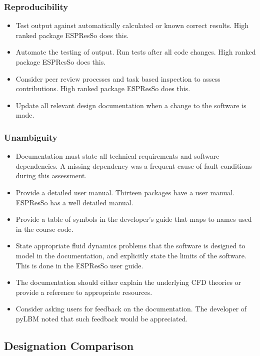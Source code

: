 \documentclass[12pt, notitlepage]{article}
\begin{document}
\subsubsection{Reproducibility}

\begin{itemize}
	\item Test output against automatically calculated or known correct results. High ranked package ESPResSo does this.
	\item Automate the testing of output. Run tests after all code changes. High ranked package ESPResSo does this.
	\item Consider peer review processes and task based inspection to assess contributions. High ranked package ESPResSo does this.
	\item Update all relevant design documentation when a change to the software is made.
\end{itemize}

\subsubsection{Unambiguity}

\begin{itemize}
	\item Documentation must state all technical requirements and software dependencies. A missing dependency was a frequent cause of fault conditions during this assessment.
	\item Provide a detailed user manual. Thirteen packages have a user manual. ESPResSo has a well detailed manual.
	\item Provide a table of symbols in the developer's guide that maps to names used in the course code.
	\item State appropriate fluid dynamics problems that the software is designed to model in the documentation, and explicitly state the limits of the software. This is done in the ESPResSo user guide.
	\item The documentation should either explain the underlying CFD theories or provide a reference to appropriate resources.
	\item Consider asking users for feedback on the documentation. The developer of pyLBM noted that such feedback would be appreciated.
\end{itemize}


\subsection{Designation Comparison}\label{comparison}
\end{document}
